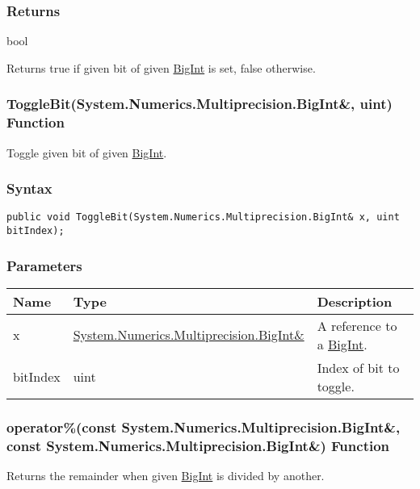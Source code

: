 \documentclass[a4paper,oneside,11.000000pt]{book}
\begin{document}
\subsubsection*{Returns}bool
\begin{flushleft}
Returns true if given bit of given \hyperlink{System.Numerics.Multiprecision.BigInt}{BigInt} is set, false otherwise.

\end{flushleft}
\clearpage

\hypertarget{System.Numerics.Multiprecision.ToggleBit.R.System.Numerics.Multiprecision.BigInt.uint}{\subsubsection*{ToggleBit(System.Numerics.Multiprecision.BigInt\&, uint) Function}}
\begin{flushleft}
Toggle given bit of given \hyperlink{System.Numerics.Multiprecision.BigInt}{BigInt}.

\end{flushleft}
\subsubsection*{Syntax}
\texttt{public void ToggleBit(System.Numerics.Multiprecision.BigInt\& x, uint bitIndex);}
\subsubsection*{Parameters}
\begin{flushleft}
\begin{supertabular}[l]{!{\raggedright}p{1.94573cm}!{\raggedright}p{7.92093cm}!{\raggedright}p{4.93333cm}}
\textbf{Name}
& \textbf{Type}
& \textbf{Description}
\\
\hline
x
& \hyperlink{System.Numerics.Multiprecision.BigInt}{System.\-Numerics.\-Multiprecision.\-BigInt\&\-}
& A reference to a \hyperlink{System.Numerics.Multiprecision.BigInt}{BigInt}.

\\
bitIndex
& uint
& Index of bit to toggle.

\\
\end{supertabular}

\end{flushleft}
\clearpage

\hypertarget{System.Numerics.Multiprecision.operator.remainder.C.R.System.Numerics.Multiprecision.BigInt.C.R.System.Numerics.Multiprecision.BigInt}{\subsubsection*{operator\%(const System.Numerics.Multiprecision.BigInt\&, const System.Numerics.Multiprecision.BigInt\&) Function}}
\begin{flushleft}
Returns the remainder when given \hyperlink{System.Numerics.Multiprecision.BigInt}{BigInt} is divided by another.

\end{flushleft}
\end{document}
